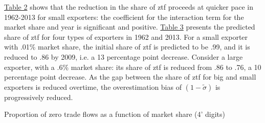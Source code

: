 \documentclass[12pt,twoside,a4paper,notitlepage]{article}
\begin{document}
{	{\hyperref[ref-005]{Table 2}} shows that the reduction in the share of ztf proceeds at quicker pace in 1962-2013 for small exporters: the coefficient for the interaction term for the market share and year is significant and positive.
	{\hyperref[ref-006]{Table 3}} presents the predicted share of ztf for four types of exporters in 1962 and 2013.
	For a  small exporter with .01\% market share, the initial share of ztf is predicted to be .99, and it is reduced to .86 by 2009, i.e.
	a 13 percentage point decrease.
	Consider a large exporter, with a .6\% market share: its share of ztf is reduced from .86 to .76, a 10 percentage point decrease.
	As the gap between the share of ztf for big and small exporters is reduced overtime, the overestimation bias of $(1-\tilde{\sigma })$ is progressively reduced.
	
	
	
	\begin{table}
		\caption{ \label{ref-005} Proportion of zero trade flows as a function of market share (4' digits)}
		
		
	\end{table}
	
	
	
}
\end{document}
